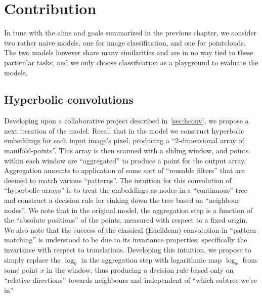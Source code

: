 \chapter{Contribution} \label{chap:conclusion}

In tune with the aims and goals summarized in the previous chapter,
we consider two rather naive models, one for image classification, and one for
pointclouds. The two models however share many similarities and are in no way
tied to these particular tasks, and we only choose classification as a
playground to evaluate the models.

\section{Hyperbolic convolutions} \label{sec:hconv-new}

Developing upon a collaborative project described
in~\autoref{sec:hconv}, we propose a next
iteration of the model. Recall that in the model we construct hyperbolic
embeddings for each input image's pixel, producing a ``\( 2 \)-dimensional
array of manifold-points''. This array is then scanned with a sliding window,
and points within each window are ``aggregated'' to produce a point for the
output array. Aggregation amounts to application of some sort of ``reusable
filters'' that are deemed to match various ``patterns''. The intuition for this convolution
of ``hyperbolic arrays'' is to treat the embeddings as nodes in a ``continuous'' tree
and construct a decision rule for sinking down the tree based on ``neighbour nodes''.
We note that in the original model, the aggregation step is a function of the
``absolute positions'' of the points, measured with respect to a fixed origin.
We also note that the success of the classical (Euclidean) convolution in
``pattern-matching'' is understood to be due to its invariance properties,
specifically the invariance with respect to translations. Developing this intuition,
we propose to simply replace the \( \log_0 \) in the aggregation step
with logarithmic map \( \log_x \) from some point \( x \) in the window, thus
producing a decision rule based only on ``relative directions'' towards neighbours
and independent of ``which subtree we're in''

